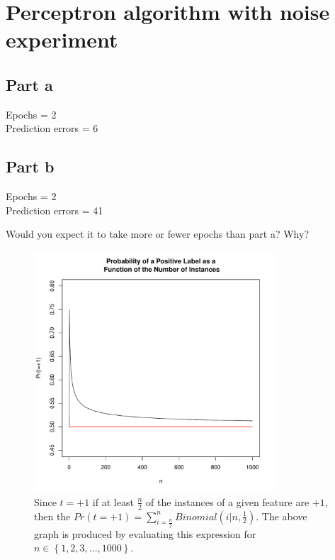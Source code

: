 \documentclass{article}
\begin{document}
\clearpage
\section{Perceptron algorithm with noise experiment}

\subsection*{Part a}
Epochs = 2 \\
Prediction errors = 6

\subsection*{Part b}

Epochs = 2 \\
Prediction errors = 41

\noindent Would you expect it to take more or fewer epochs than part a? Why?

\begin{figure}[h!]
\centering
\includegraphics[width=0.8\textwidth]{bFig.pdf}
\caption{Since $t=+1$ if at least $\frac{n}{2}$ of the instances of a given feature are $+1$, then the \mbox{$Pr(t=+1)=\sum_{i=\frac{n}{2}}^n Binomial(i|n,\frac{1}{2})$.}
The above graph is produced by evaluating this expression for \mbox{$n\in\left\{1,2,3,...,1000\right\}$.}
}
\label{bFig}
\end{figure}
\end{document}
